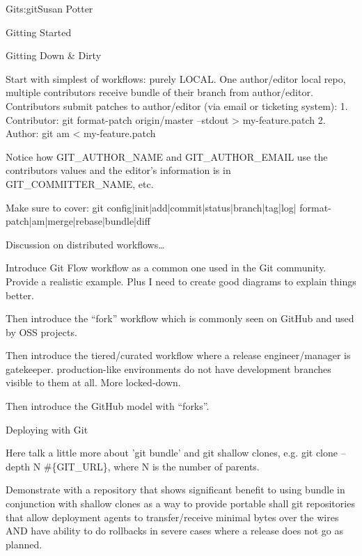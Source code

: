 \begin{aosachapter}{Git}{s:git}{Susan Potter}
\begin{aosasect1}{Gitting Started}
\end{aosasect1}

\begin{aosasect1}{Gitting Down \& Dirty}

Start with simplest of workflows: purely LOCAL. One author/editor local repo,
multiple contributors receive bundle of their branch from author/editor.
Contributors submit patches to author/editor (via email or ticketing system):
1. Contributor: git format-patch origin/master --stdout > my-feature.patch
2. Author: git am < my-feature.patch

Notice how GIT\_AUTHOR\_NAME and GIT\_AUTHOR\_EMAIL use the contributors
values and the editor's information is in GIT\_COMMITTER\_NAME, etc.

Make sure to cover: git config|init|add|commit|status|branch|tag|log|
format-patch|am|merge|rebase|bundle|diff


Discussion on distributed workflows\ldots

Introduce Git Flow workflow as a common one used in the Git community. Provide
a realistic example. Plus I need to create good diagrams to explain things
better.

Then introduce the ``fork'' workflow which is commonly seen on GitHub and
used by OSS projects.

Then introduce the tiered/curated workflow where a release engineer/manager
is gatekeeper. production-like environments do not have development branches
visible to them at all. More locked-down.

Then introduce the GitHub model with ``forks''.

\end{aosasect1}

\begin{aosasect1}{Deploying with Git}

Here talk a little more about 'git bundle' and git shallow clones, e.g.
git clone --depth N \#\{GIT\_URL\}, where N is the number of parents.

Demonstrate with a repository that shows significant benefit to using
bundle in conjunction with shallow clones as a way to provide portable
shall git repositories that allow deployment agents to transfer/receive
minimal bytes over the wires AND have ability to do rollbacks in severe
cases where a release does not go as planned.

\end{aosasect1}

\end{aosachapter}
